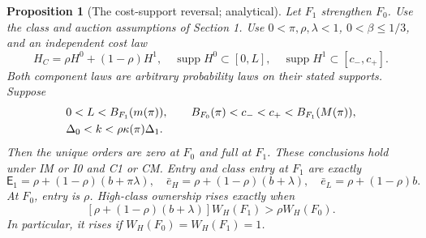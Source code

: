 \documentclass[12pt]{article}
\newtheorem{proposition}{Proposition}
\newcommand{\Ent}{\mathsf E}
\newcommand{\supp}{\operatorname{supp}}
\begin{document}
\begin{proposition}[The cost-support reversal; analytical]\label{prop:atomless}
Let $F_1$ strengthen $F_0$.
Use the class and auction assumptions of Section 1.
Use $0<\pi,\rho,\lambda<1$, $0<\beta\le1/3$, and an independent cost law
\[
 H_C=\rho H^0+(1-\rho)H^1,\quad
 \supp H^0\subset[0,L],\quad \supp H^1\subset[c_-,c_+].
\]
Both component laws are arbitrary probability laws on their stated supports.
Suppose
\begin{align}\label{eq:costconditions}
 &0<L<B_{F_1}(m(\pi)),\qquad
 B_{F_0}(\pi)<c_-<c_+<B_{F_1}(M(\pi)),\\
 &\Delta_0<k<\rho\kappa(\pi)\Delta_1.\notag
\end{align}
Then the unique orders are zero at $F_0$ and full at $F_1$.
These conclusions hold under IM or I0 and C1 or CM.
Entry and class entry at $F_1$ are exactly
\begin{equation}\label{eq:costentry}
 \Ent_1=\rho+(1-\rho)(b+\pi\lambda),\quad
 \bar e_H=\rho+(1-\rho)(b+\lambda),\quad
 \bar e_L=\rho+(1-\rho)b.
\end{equation}
At $F_0$, entry is $\rho$.
High-class ownership rises exactly when
\begin{equation}\label{eq:owncondition}
 [\rho+(1-\rho)(b+\lambda)]W_H(F_1)>\rho W_H(F_0).
\end{equation}
In particular, it rises if $W_H(F_0)=W_H(F_1)=1$.
\end{proposition}
\end{document}

